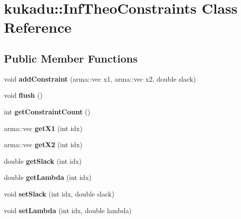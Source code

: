 \hypertarget{classkukadu_1_1InfTheoConstraints}{\section{kukadu\-:\-:Inf\-Theo\-Constraints Class Reference}
\label{classkukadu_1_1InfTheoConstraints}
}
\subsection*{Public Member Functions}
\begin{DoxyCompactItemize}
\item 
\hypertarget{classkukadu_1_1InfTheoConstraints_aa25c31a3ac239b93ca899d5c0dab9f49}{void {\bfseries add\-Constraint} (arma\-::vec x1, arma\-::vec x2, double slack)}\label{classkukadu_1_1InfTheoConstraints_aa25c31a3ac239b93ca899d5c0dab9f49}

\item 
\hypertarget{classkukadu_1_1InfTheoConstraints_ac1d85733f326e20e6900ad3debafda0f}{void {\bfseries flush} ()}\label{classkukadu_1_1InfTheoConstraints_ac1d85733f326e20e6900ad3debafda0f}

\item 
\hypertarget{classkukadu_1_1InfTheoConstraints_a722ffde92b39ab76c9fde6629acbebf6}{int {\bfseries get\-Constraint\-Count} ()}\label{classkukadu_1_1InfTheoConstraints_a722ffde92b39ab76c9fde6629acbebf6}

\item 
\hypertarget{classkukadu_1_1InfTheoConstraints_a085b65427f852bad0414f758cd21821e}{arma\-::vec {\bfseries get\-X1} (int idx)}\label{classkukadu_1_1InfTheoConstraints_a085b65427f852bad0414f758cd21821e}

\item 
\hypertarget{classkukadu_1_1InfTheoConstraints_aea03b865c1285775b57fcf88f1d7104c}{arma\-::vec {\bfseries get\-X2} (int idx)}\label{classkukadu_1_1InfTheoConstraints_aea03b865c1285775b57fcf88f1d7104c}

\item 
\hypertarget{classkukadu_1_1InfTheoConstraints_ac006e5b1d58e8fbea8985786766d6596}{double {\bfseries get\-Slack} (int idx)}\label{classkukadu_1_1InfTheoConstraints_ac006e5b1d58e8fbea8985786766d6596}

\item 
\hypertarget{classkukadu_1_1InfTheoConstraints_a164b756056c091f61414275c05617b01}{double {\bfseries get\-Lambda} (int idx)}\label{classkukadu_1_1InfTheoConstraints_a164b756056c091f61414275c05617b01}

\item 
\hypertarget{classkukadu_1_1InfTheoConstraints_adb17a3786b877a8001051697131349c4}{void {\bfseries set\-Slack} (int idx, double slack)}\label{classkukadu_1_1InfTheoConstraints_adb17a3786b877a8001051697131349c4}

\item 
\hypertarget{classkukadu_1_1InfTheoConstraints_ac418da12a5d931c5acee6dc724123f3a}{void {\bfseries set\-Lambda} (int idx, double lambda)}\label{classkukadu_1_1InfTheoConstraints_ac418da12a5d931c5acee6dc724123f3a}

\end{DoxyCompactItemize}


